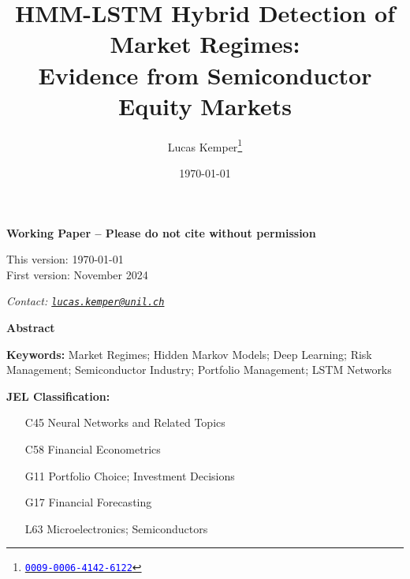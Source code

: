 \documentclass[12pt,a4paper]{article}
\title{
    \vspace{-2em}  %
    \LARGE\textbf{HMM-LSTM Hybrid Detection of Market Regimes:\\[0.5em]
    Evidence from Semiconductor Equity Markets}
    \vspace{-0.5em}
}
\author[1]{Lucas Kemper\thanks{\href{https://orcid.org/0009-0006-4142-6122}{\textcolor{blue}{\faOrcid\space\texttt{0009-0006-4142-6122}}}}}
\affil[1]{MscF Student, HEC Lausanne, University of Lausanne}
\date{\today}
\renewenvironment{abstract}{
    \begin{center}
        \bfseries\large Abstract
    \end{center}
    \quotation\small
}{\endquotation}
\begin{document}
\maketitle

\begin{center}
\large\textbf{Working Paper -- Please do not cite without permission}
\vspace{1em}

\normalsize
This version: \today\\
First version: November 2024

\vspace{1em}
\textit{Contact: \href{mailto:lucas.kemper@unil.ch}{\texttt{lucas.kemper@unil.ch}}}
\end{center}

\newpage

\begin{abstract}

\end{abstract}

\vspace{1em}
\noindent\textbf{Keywords:} Market Regimes; Hidden Markov Models; Deep Learning; Risk Management; Semiconductor Industry; Portfolio Management; LSTM Networks

\vspace{0.5em}
\noindent\textbf{JEL Classification:}
\begin{itemize}[noitemsep,labelindent=0pt,labelsep=1em]
    \item[C45] Neural Networks and Related Topics
    \item[C58] Financial Econometrics
    \item[G11] Portfolio Choice; Investment Decisions
    \item[G17] Financial Forecasting
    \item[L63] Microelectronics; Semiconductors
\end{itemize}







\printbibliography
\end{document}

